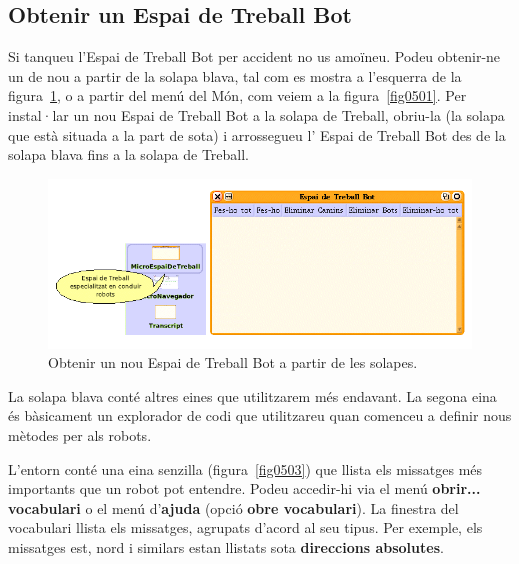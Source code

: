 \subsection{Obtenir un \textsf{Espai de Treball Bot}}
Si tanqueu l'\textsf{Espai de Treball Bot} per accident no us amoïneu. Podeu obtenir-ne un de nou a partir de la solapa blava, tal com es mostra a l'esquerra de la figura~\ref{fig0502}, o a partir del menú del Món, com veiem a la figura~\ref{fig0501}. Per instal·lar un nou \textsf{Espai de Treball Bot} a la solapa de Treball, obriu-la (la solapa que està situada a la part de sota) i arrossegueu l' \textsf{Espai de Treball Bot} des de la solapa blava fins a la solapa de Treball.
\begin{figure}[h]
\begin{center}
\includegraphics[scale=1.65]{Imatges/figura5-2.png}
\end{center}
\caption{Obtenir un nou \textsf{\upshape Espai de Treball Bot} a partir de les solapes.}
\label{fig0502}
\end{figure}

La solapa blava conté altres eines que utilitzarem més endavant. La segona eina és bàsicament un explorador de codi que utilitzareu quan comenceu a definir nous mètodes per als robots.

L'entorn conté una eina senzilla (figura~\ref{fig0503}) que llista els missatges més importants que un robot pot entendre. Podeu accedir-hi via el menú \textbf{obrir... vocabulari} o el menú d'\textbf{ajuda} (opció \textbf{obre vocabulari}). La finestra del vocabulari llista els missatges, agrupats d'acord al seu tipus. Per exemple, els missatges \textsf{est}, \textsf{nord} i similars estan llistats sota \textbf{direccions absolutes}. 

